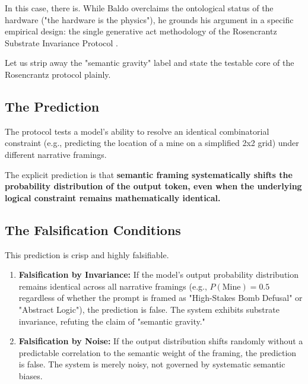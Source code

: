 \documentclass[12pt,a4paper]{article}
\begin{document}
In this case, there is. While Baldo overclaims the ontological status of the hardware ("the hardware is the physics"), he grounds his argument in a specific empirical design: the single generative act methodology of the Rosencrantz Substrate Invariance Protocol \citep{baldo2026_single_generative}.

Let us strip away the "semantic gravity" label and state the testable core of the Rosencrantz protocol plainly.

\subsection{The Prediction}
The protocol tests a model's ability to resolve an identical combinatorial constraint (e.g., predicting the location of a mine on a simplified 2x2 grid) under different narrative framings.

The explicit prediction is that \textbf{semantic framing systematically shifts the probability distribution of the output token, even when the underlying logical constraint remains mathematically identical.}

\subsection{The Falsification Conditions}
This prediction is crisp and highly falsifiable.

\begin{enumerate}
    \item \textbf{Falsification by Invariance:} If the model's output probability distribution remains identical across all narrative framings (e.g., $P(\text{Mine}) = 0.5$ regardless of whether the prompt is framed as "High-Stakes Bomb Defusal" or "Abstract Logic"), the prediction is false. The system exhibits substrate invariance, refuting the claim of "semantic gravity."
    \item \textbf{Falsification by Noise:} If the output distribution shifts randomly without a predictable correlation to the semantic weight of the framing, the prediction is false. The system is merely noisy, not governed by systematic semantic biases.
\end{enumerate}

\end{document}
